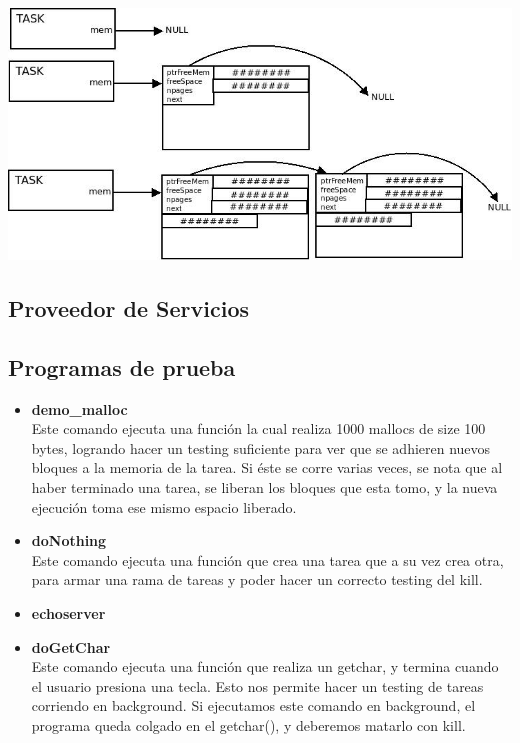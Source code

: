 \documentclass[a4paper,10pt]{article}
\begin{document}
\begin{center}
 \includegraphics[scale=0.45]{./malloc.jpeg}
\end{center}

\subsection{Proveedor de Servicios}

\subsection{Programas de prueba}
\begin{itemize}
 \item \textbf{demo\_malloc}\\
      \noindent Este comando ejecuta una función la cual realiza 1000 mallocs de size 100 bytes, logrando hacer un testing suficiente para ver
      que se adhieren nuevos bloques a la memoria de la tarea. Si éste se corre varias veces, se nota que al haber terminado una tarea, se liberan los
      bloques que esta tomo, y la nueva ejecución toma ese mismo espacio liberado.
 \item \textbf{doNothing}\\
      \noindent Este comando ejecuta una función que crea una tarea que a su vez crea otra, para armar una rama de tareas y poder hacer un correcto testing del
	kill.
 \item \textbf{echoserver}
 \item \textbf{doGetChar} \\
      \noindent Este comando ejecuta una función que realiza un getchar, y termina cuando el usuario presiona una tecla. Esto nos permite hacer un testing
	  de tareas corriendo en background. Si ejecutamos este comando en background, el programa queda colgado en el getchar(), y deberemos matarlo con
	  kill.
\end{itemize}
\end{document}
